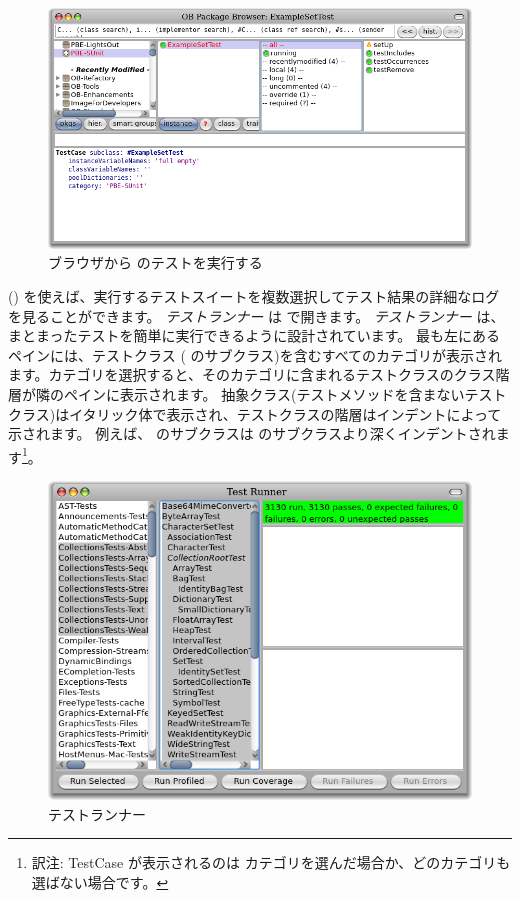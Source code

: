 \documentclass[a4paper,10pt,twoside]{book}
\begin{document}
\begin{figure}[tbh]
  \begin{center}
	\includegraphics[width=\linewidth]{browser-tests}
	\caption{ブラウザから \sunit のテストを実行する}
  \end{center}
\end{figure}

\sunit {} () を使えば、実行するテストスイートを複数選択してテスト結果の詳細なログを見ることができます。
\emph{テストランナー} は  で開きます。
\emph{テストランナー} は、まとまったテストを簡単に実行できるように設計されています。
最も左にあるペインには、テストクラス (\ie {} のサブクラス)を含むすべてのカテゴリが表示されます。カテゴリを選択すると、そのカテゴリに含まれるテストクラスのクラス階層が隣のペインに表示されます。
抽象クラス(テストメソッドを含まないテストクラス)はイタリック体で表示され、テストクラスの階層はインデントによって示されます。
例えば、 のサブクラスは  のサブクラスより深くインデントされます\footnote{訳注: TestCase が表示されるのは  カテゴリを選んだ場合か、どのカテゴリも選ばない場合です。}。

\begin{figure}[tbh]
  \begin{center}
	\includegraphics[width=\linewidth]{test-runner}
	\caption{\pharo \sunit テストランナー}
  \end{center}
\end{figure}
\end{document}
